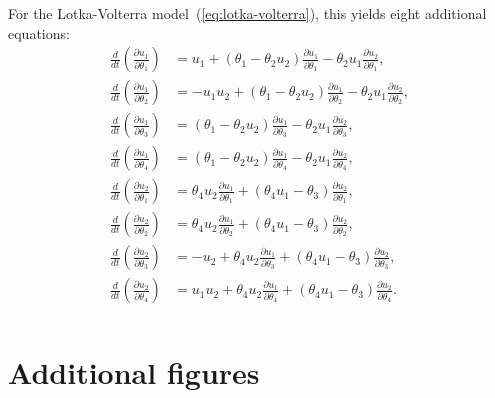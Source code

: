 \documentclass[11pt,a4paper]{report}
\begin{document}

For the Lotka-Volterra model~(\ref{eq:lotka-volterra}), this yields eight additional equations:
\begin{equation*}
\begin{aligned}
\frac{d}{dt}\left(\frac{\partial u_1}{\partial \theta_1}\right) &= u_1 + (\theta_1 - \theta_2 u_2) \frac{\partial u_1}{\partial \theta_1} - \theta_2 u_1 \frac{\partial u_2}{\partial \theta_1}, \\
\frac{d}{dt}\left(\frac{\partial u_1}{\partial \theta_2}\right) &= - u_1 u_2 + (\theta_1 - \theta_2 u_2) \frac{\partial u_1}{\partial \theta_2} - \theta_2 u_1 \frac{\partial u_2}{\partial \theta_2}, \\
\frac{d}{dt}\left(\frac{\partial u_1}{\partial \theta_3}\right) &= (\theta_1 - \theta_2 u_2) \frac{\partial u_1}{\partial \theta_3} - \theta_2 u_1 \frac{\partial u_2}{\partial \theta_3}, \\
\frac{d}{dt}\left(\frac{\partial u_1}{\partial \theta_4}\right) &= (\theta_1 - \theta_2 u_2) \frac{\partial u_1}{\partial \theta_4} - \theta_2 u_1 \frac{\partial u_2}{\partial \theta_4}, \\
\frac{d}{dt}\left(\frac{\partial u_2}{\partial \theta_1}\right) &= \theta_4 u_2 \frac{\partial u_1}{\partial \theta_1} + (\theta_4 u_1 - \theta_3) \frac{\partial u_2}{\partial \theta_1}, \\
\frac{d}{dt}\left(\frac{\partial u_2}{\partial \theta_2}\right) &= \theta_4 u_2 \frac{\partial u_1}{\partial \theta_2} + (\theta_4 u_1 - \theta_3) \frac{\partial u_2}{\partial \theta_2}, \\
\frac{d}{dt}\left(\frac{\partial u_2}{\partial \theta_3}\right) &= -u_2 + \theta_4 u_2 \frac{\partial u_1}{\partial \theta_3} + (\theta_4 u_1 - \theta_3) \frac{\partial u_2}{\partial \theta_3}, \\
\frac{d}{dt}\left(\frac{\partial u_2}{\partial \theta_4}\right) &= u_1 u_2 + \theta_4 u_2 \frac{\partial u_1}{\partial \theta_4} + (\theta_4 u_1 - \theta_3) \frac{\partial u_2}{\partial \theta_4}. \\
\end{aligned}
\end{equation*}

\chapter{Additional figures}
\label{appendix:figures}
\end{document}
